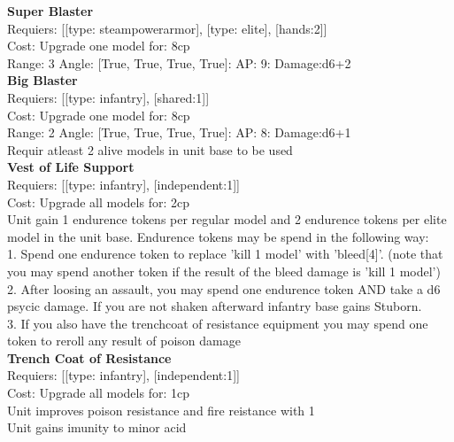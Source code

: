 {\bf Super Blaster } \\

Requiers: [[type: steampowerarmor], [type: elite], [hands:2]] \\
Cost: Upgrade one model for: 8cp \\


Range: 3  Angle: [True, True, True, True]: AP: 9: Damage:d6+2 \\






{\bf Big Blaster } \\

Requiers: [[type: infantry], [shared:1]] \\
Cost: Upgrade one model for: 8cp \\


Range: 2  Angle: [True, True, True, True]: AP: 8: Damage:d6+1 \\
Requir atleast 2 alive models in unit base to be used\\ 






{\bf Vest of Life Support } \\

Requiers: [[type: infantry], [independent:1]] \\
Cost: Upgrade all models for: 2cp \\
Unit gain 1 endurence tokens per regular model  and 2 endurence tokens per elite model in the unit base. Endurence tokens may be spend in the following way:\\ 
1. Spend one endurence token to replace 'kill 1 model' with 'bleed[4]'. (note that you may spend another token if the result of the bleed damage is 'kill 1 model')\\ 
2. After loosing an assault, you may spend one endurence token AND take a d6 psycic damage. If you are not shaken afterward infantry base gains Stuborn.\\ 
3. If you also have the trenchcoat of resistance equipment you may spend one token to reroll any result of poison damage\\ 







{\bf Trench Coat of Resistance } \\

Requiers: [[type: infantry], [independent:1]] \\
Cost: Upgrade all models for: 1cp \\
Unit improves poison resistance and fire reistance with 1\\ 
Unit gains imunity to minor acid\\ 







